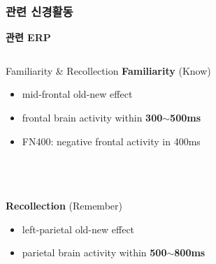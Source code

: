 \documentclass{beamer}
\begin{document}
\subsubsection{관련 신경활동}
\begin{frame}{\textbf{관련 ERP}}
  \begin{columns}
    \begin{column}{0.5\textwidth}
      \begin{block}{Familiarity \& Recollection}
        \textbf{Familiarity} (Know)
        \begin{itemize}
          \item mid-frontal old-new effect
          \item frontal brain activity within \textbf{300$\sim$500ms}
          \item FN400: negative frontal activity in 400ms
        \end{itemize}\\~\\~\\
        \textbf{Recollection} (Remember)
        \begin{itemize}
          \item left-parietal old-new effect
          \item parietal brain activity within \textbf{500$\sim$800ms}
        \end{itemize}
      \end{block}
    \end{column}
    \hfill
    \begin{column}{0.48\textwidth}
      \begin{figure}
        \centering

\end{figure}
\end{column}
\end{columns}
\end{frame}
\end{document}
